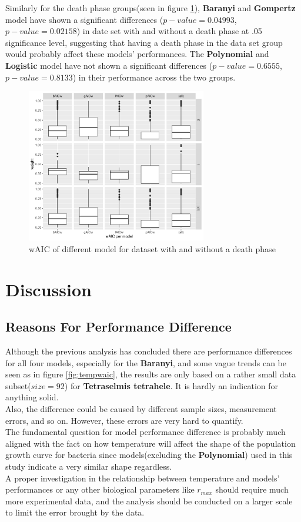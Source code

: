 \documentclass[11pt]{article}
\begin{document}
\FloatBarrier
Similarly for the death phase groups(seen in figure \ref{fig:deathphasewaic}), \textbf{Baranyi} and \textbf{Gompertz} model have shown a significant differences ($p-value = 0.04993$, $p-value = 0.02158$) in date set with and without a death phase at .05 significance level, suggesting that having a death phase in the data set group would probably affect these models' performances. The \textbf{Polynomial} and \textbf{Logistic} model have not shown a significant differences ($p-value = 0.6555$, $p-value = 0.8133$) in their performance across the two groups.
\FloatBarrier
\begin{figure}[!htbp]
    \centering
    \includegraphics[width=0.7\textwidth]{../Results/anaPlots/wAICdeathphase.pdf}
    \caption{wAIC of different model for dataset with and without a death phase}
    \label{fig:deathphasewaic}
\end{figure}
\FloatBarrier

\section{Discussion}
\subsection{Reasons For Performance Difference}
Although the previous analysis has concluded there are performance differences for all four models, especially for the \textbf{Baranyi}, and some vague trends can be seen as in figure \ref{fig:tempwaic}, the results are only based on a rather small data subset($size = 92$) for \textbf{Tetraselmis tetrahele}. It is hardly an indication for anything solid.\\
Also, the difference could be caused by different sample sizes, measurement errors, and so on. However, these errors are very hard to quantify.\\
The fundamental question for model performance difference is probably much aligned with the fact on how temperature will affect the shape of the population growth curve for bacteria since models(excluding the \textbf{Polynomial}) used in this study indicate a very similar shape regardless.\\
A proper investigation in the relationship between temperature and models' performances or any other biological parameters like $r_{max}$ should require much more experimental data, and the analysis should be conducted on a larger scale to limit the error brought by the data.
\end{document}

